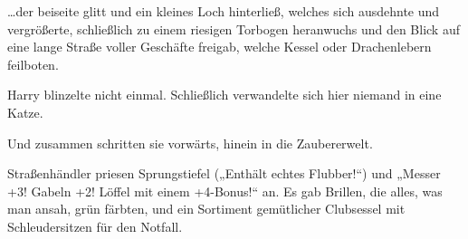 …der beiseite glitt und ein kleines Loch hinterließ, welches sich ausdehnte und vergrößerte, schließlich zu einem riesigen Torbogen heranwuchs und den Blick auf eine lange Straße voller Geschäfte freigab, welche Kessel oder Drachenlebern feilboten.

Harry blinzelte nicht einmal. Schließlich verwandelte sich hier niemand in eine Katze.

Und zusammen schritten sie vorwärts, hinein in die Zaubererwelt.

Straßenhändler priesen Sprungstiefel („Enthält echtes Flubber!“) und „Messer +3! Gabeln +2! Löffel mit einem +4-Bonus!“ an. Es gab Brillen, die alles, was man ansah, grün färbten, und ein Sortiment gemütlicher Clubsessel mit Schleudersitzen für den Notfall.

